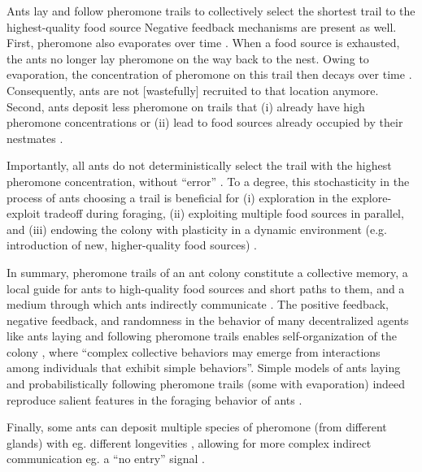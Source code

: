 \documentclass[11pt, oneside]{article}
\begin{document}
\begin{mybox}[label=box:ants, breakable]{Ants lay and follow pheromone trails to collectively select the shortest trail to the highest-quality food source}
Negative feedback mechanisms are present as well. 
First, pheromone also evaporates over time \cite{jackson2006communication}.
When a food source is exhausted, the ants no longer lay pheromone on the way back to the nest. Owing to evaporation, the concentration of pheromone on this trail then decays over time \cite{david2009trail,van2011temperature}. Consequently, ants are not [wastefully] recruited to that location anymore. 
Second, ants deposit less pheromone on trails that (i) already have high pheromone concentrations \cite{czaczkes2013ant} or (ii) lead to food sources already occupied by their nestmates \cite{wendt2020negative}.

Importantly, all ants do not deterministically select the trail with the highest pheromone concentration, without ``error'' \cite{deneubourg1990self}.
To a degree, this stochasticity in the process of ants choosing a trail is beneficial for 
(i) exploration in the explore-exploit tradeoff during foraging, 
(ii) exploiting multiple food sources in parallel, 
and 
(iii) endowing the colony with plasticity in a dynamic environment (e.g. introduction of new, higher-quality food sources) \cite{deneubourg1983probabilistic,shiraishi2019diverse,deneubourg1986random,dussutour2009noise,edelstein1995trail}.

In summary, pheromone trails of an ant colony constitute a collective memory, a local guide for ants to high-quality food sources and short paths to them, and a medium through which ants indirectly communicate \cite{jackson2006communication}. 
The positive feedback, negative feedback, and randomness in the behavior of many decentralized agents like ants laying and following pheromone trails enables self-organization of the colony \cite{bonabeau1997self}, where ``complex collective behaviors may emerge from interactions among individuals that exhibit simple behaviors''.
Simple models of ants laying and probabilistically following pheromone trails (some with evaporation) indeed reproduce salient features in the foraging behavior of ants \cite{bonabeau1999swarm,goss1989self,jackson2006communication,edelstein1995trail,watmough1995modelling}.

Finally, some ants can deposit multiple species of pheromone (from different glands) with eg. different longevities \cite{czaczkes2015trail}, allowing for more complex indirect communication \cite{jackson2006communication} eg. a ``no entry'' signal \cite{robinson2005no}. 
\end{mybox}
\end{document}
